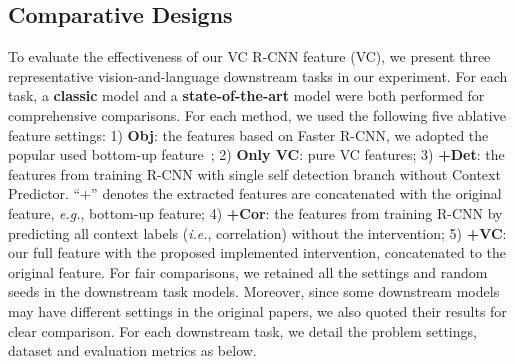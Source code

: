 \documentclass[10pt,twocolumn,letterpaper]{article}
\newcommand\ies{\textit{i.e.}}
\newcommand\egs{\textit{e.g.}}
\begin{document}
\subsection{Comparative Designs}
To evaluate the effectiveness of our VC R-CNN feature (VC), we present three representative vision-and-language downstream tasks in our experiment.
For each task, a \textbf{classic} model and a \textbf{state-of-the-art} model were both performed for comprehensive comparisons.
For each method, we used the following five ablative feature settings: 
1) \textbf{Obj}: the features based on Faster R-CNN, we adopted the popular used bottom-up feature~\cite{anderson2018bottom}; 2)  \textbf{Only VC}: pure VC features; 3) \textbf{+Det}: the features from training R-CNN with single self detection branch without Context Predictor. ``+'' denotes the extracted features are concatenated with the original feature, \egs, bottom-up feature; 4) \textbf{+Cor}: the features from training R-CNN by predicting all context labels (\ies, correlation) without the intervention; 5) \textbf{+VC}: our full feature with the proposed implemented intervention, concatenated to the original feature.
For fair comparisons, we retained all the settings and random seeds in the downstream task models.
Moreover, since some downstream models may have different settings in the original papers, we also quoted their results for clear comparison. For each downstream task, we detail the problem settings, dataset and evaluation metrics as below.
\end{document}

